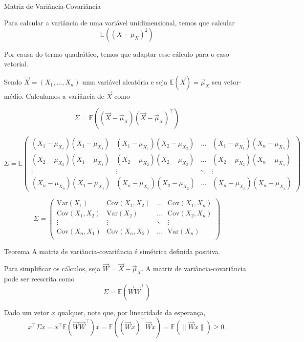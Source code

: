 \documentclass[
  ignorenonframetext,
  aspectratio=169,
]{beamer}
\newcommand{\EE}{\mathbb{E}}
\newcommand{\vX}{\vec{X}}
\newcommand{\vmu}{\vec{\mu}}
\begin{document}
\begin{frame}{Matriz de Variância-Covariância}

  Para calcular a variância de uma variável unidimensional, temos que
  calcular \[\EE((X-\mu_X)^2)\]

  Por causa do termo quadrático, temos que adaptar esse cálculo para o
  caso vetorial.

Sendo \(\vX = (X_1,\ldots,X_n)\) uma variável aleatória e seja
\(\EE(\vX) = \vmu_X\) seu vetor-médio. Calculamos a variância de
\(\vX\) como

\[\Sigma = \EE((\vX-\vmu_X)(\vX-\vmu_X)^\top)\]

\end{frame}

\begin{frame}
\[\Sigma = \EE\begin{pmatrix}  
(X_1 -\mu_{X_1})(X_1 -\mu_{X_1}) & (X_1 -\mu_{X_1})(X_2 -\mu_{X_2}) & \ldots &  (X_1 -\mu_{X_1})(X_n -\mu_{X_n}) \\
(X_2 -\mu_{X_2})(X_1 -\mu_{X_1}) & (X_2 -\mu_{X_2})(X_2 -\mu_{X_2}) & \ldots &  (X_2 -\mu_{X_2})(X_n -\mu_{X_n}) \\
\vdots & \vdots  & \ddots & \vdots \\
(X_n -\mu_{X_n})(X_1 -\mu_{X_1}) & (X_n -\mu_{X_n})(X_2 -\mu_{X_2}) & \ldots & (X_n -\mu_{X_n})(X_n -\mu_{X_n})
\end{pmatrix}\]
\end{frame}

\begin{frame}
\[\Sigma = \begin{pmatrix}  
\text{Var}(X_1) & \text{Cov}(X_1,X_2) & \ldots & \text{Cov}(X_1,X_n)\\
\text{Cov}(X_1,X_2) & \text{Var}(X_2) & \ldots & \text{Cov}(X_2,X_n)\\
\vdots & \vdots  & \ddots & \vdots \\
\text{Cov}(X_n,X_1) & \text{Cov}(X_n,X_2) & \ldots & \text{Var}(X_n)\\
\end{pmatrix}\]
\end{frame}

\begin{frame}
\begin{block}{Teorema}
A matriz de variância-covariância é simétrica definida positiva.
\end{block}

\pause

Para simplificar os cálculos, seja $\vec W = \vX - \vmu_X$. A matriz de variância-covariância pode ser reescrita como
\[\Sigma = \EE(\vec W\vec W^\top)\]

Dado um vetor \(x\) qualquer, note que, por linearidade da esperança,
\[x^\top \Sigma x = x^\top\EE(\vec W\vec W^\top)x = \EE((\vec Wx)^\top \vec Wx) = \EE(\|\vec W x\|) \ge 0.\]
\end{frame}
\end{document}

